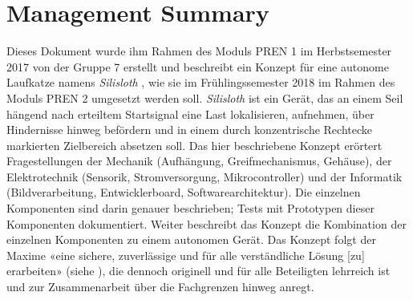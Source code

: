 \section*{Management Summary}

Dieses Dokument wurde ihm Rahmen des Moduls PREN 1 im Herbstsemester 2017 von der Gruppe 7 erstellt und beschreibt ein Konzept für eine autonome Laufkatze namens \textit{Silisloth} , wie sie im Frühlingssemester 2018 im Rahmen des Moduls PREN 2 umgesetzt werden soll. \textit{Silisloth} ist ein Gerät, das an einem Seil hängend nach erteiltem Startsignal eine Last lokalisieren, aufnehmen, über Hindernisse hinweg befördern und in einem durch konzentrische Rechtecke markierten Zielbereich absetzen soll. Das hier beschriebene Konzept erörtert Fragestellungen der Mechanik (Aufhängung, Greifmechanismus, Gehäuse), der Elektrotechnik (Sensorik, Stromversorgung, Mikrocontroller) und der Informatik (Bildverarbeitung, Entwicklerboard, Softwarearchitektur). Die einzelnen Komponenten sind darin genauer beschrieben; Tests mit Prototypen dieser Komponenten dokumentiert. Weiter beschreibt das Konzept die Kombination der einzelnen Komponenten zu einem autonomen Gerät. Das Konzept folgt der Maxime «eine sichere, zuverlässige und für alle verständliche Lösung [zu] erarbeiten» (siehe ), die dennoch originell und für alle Beteiligten lehrreich ist und zur Zusammenarbeit über die Fachgrenzen hinweg anregt.
